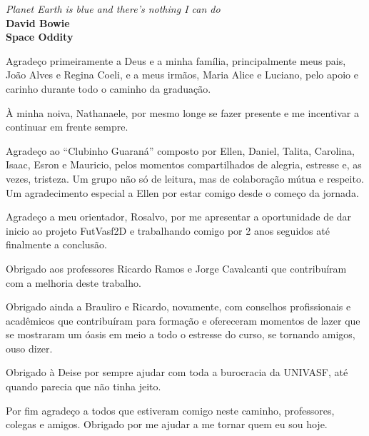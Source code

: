 \newpage
\begin{epigrafe}
\vspace*{\fill}
\begin{flushright}
		\textit{Planet Earth is blue and there's nothing I can do}\\
		\textbf{David Bowie}\\
		\textbf{Space Oddity}
\end{flushright}
\end{epigrafe}
\begin{agradecimentos}
	
Agradeço primeiramente a Deus e a minha família, principalmente meus pais, João
Alves e Regina Coeli, e a meus irmãos, Maria Alice e Luciano, pelo apoio e carinho
durante todo o caminho da graduação.

À minha noiva, Nathanaele, por mesmo longe se fazer presente e me incentivar a
continuar em frente sempre.

Agradeço ao ``Clubinho Guaraná'' composto por Ellen, Daniel, Talita, Carolina,
Isaac, Esron e Mauricio, pelos momentos compartilhados de alegria, estresse e,
as vezes, tristeza. Um grupo não só de leitura, mas de colaboração mútua e
respeito. Um agradecimento especial a Ellen por estar comigo desde o começo da
jornada.

Agradeço a meu orientador, Rosalvo, por me apresentar a oportunidade de dar
inicio ao projeto FutVasf2D e trabalhando comigo por 2 anos seguidos até
finalmente a conclusão.

Obrigado aos professores Ricardo Ramos e Jorge Cavalcanti que contribuíram com a
melhoria deste trabalho.

Obrigado ainda a Brauliro e Ricardo, novamente, com conselhos profissionais e
acadêmicos que contribuíram para formação e ofereceram momentos de lazer que se mostraram
um óasis em meio a todo o estresse do curso, se tornando amigos, ouso dizer.

Obrigado à Deise por sempre ajudar com toda a burocracia da UNIVASF, até quando
parecia que não tinha jeito.

Por fim agradeço a todos que estiveram comigo neste caminho, professores,
colegas e amigos. Obrigado por me ajudar a me tornar quem eu sou hoje.

\end{agradecimentos}

